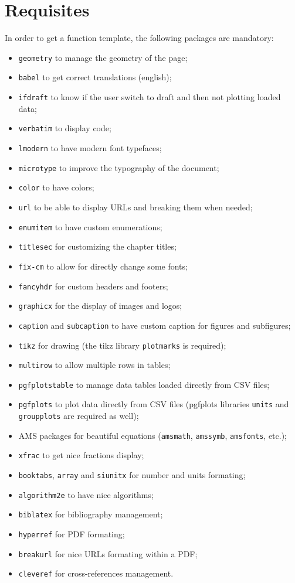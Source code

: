 \documentclass[a4paper,12pt,oneside]{report}
\begin{document}
	\chapter{Requisites}
			In order to get a function template, the following packages are mandatory:
			\begin{itemize}
				\item \texttt{geometry} to manage the geometry of the page;
				\item \texttt{babel} to get correct translations (english);
				\item \texttt{ifdraft} to know if the user switch to draft and then not plotting loaded data;
				\item \texttt{verbatim} to display code;
				\item \texttt{lmodern} to have modern font typefaces;
				\item \texttt{microtype} to improve the typography of the document;
				\item \texttt{color} to have colors;
				\item \texttt{url} to be able to display URLs and breaking them when needed;
				\item \texttt{enumitem} to have custom enumerations;
				\item \texttt{titlesec} for customizing the chapter titles;
				\item \texttt{fix-cm} to allow for directly change some fonts;
				\item \texttt{fancyhdr} for custom headers and footers;
				\item \texttt{graphicx} for the display of images and logos;
				\item \texttt{caption} and \texttt{subcaption} to have custom caption for figures and subfigures;
				\item \texttt{tikz} for drawing (the tikz library \texttt{plotmarks} is required);
				\item \texttt{multirow} to allow multiple rows in tables;
				\item \texttt{pgfplotstable} to manage data tables loaded directly from CSV files;
				\item \texttt{pgfplots} to plot data directly from CSV files (pgfplots libraries \texttt{units} and \texttt{groupplots} are required as well);
				\item AMS packages for beautiful equations (\texttt{amsmath}, \texttt{amssymb}, \texttt{amsfonts}, etc.);
				\item \texttt{xfrac} to get nice fractions display;
				\item \texttt{booktabs}, \texttt{array} and \texttt{siunitx} for number and units formating;
				\item \texttt{algorithm2e} to have nice algorithms;
				\item \texttt{biblatex} for bibliography management;
				\item \texttt{hyperref} for PDF formating;
				\item \texttt{breakurl} for nice URLs formating within a PDF;
				\item \texttt{cleveref} for cross-references management.
			\end{itemize}
\end{document}
